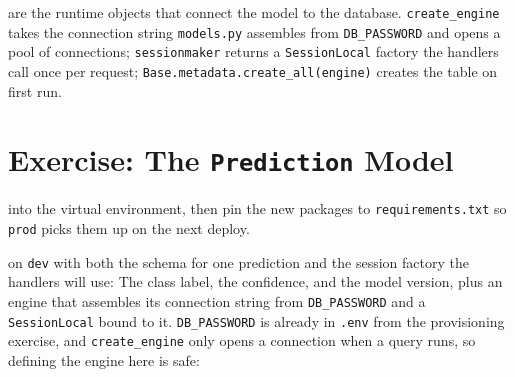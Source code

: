  are the runtime objects that connect
the model to the database. \texttt{create\_engine} takes the connection
string \texttt{models.py} assembles from \texttt{DB\_PASSWORD} and opens a
pool of connections;
\texttt{sessionmaker} returns a \texttt{SessionLocal} factory the handlers
call once per request; \texttt{Base.metadata.create\_all(engine)} creates
the table on first run.


\newpage
\section{Exercise: The \texttt{Prediction} Model}

 into the
virtual environment, then pin the new packages to
\texttt{requirements.txt} so \texttt{prod} picks them up on the next
deploy.


 on \texttt{dev} with both the
schema for one prediction and the session factory the handlers will use:
The class label, the confidence, and the model version, plus an engine
that assembles its connection string from \texttt{DB\_PASSWORD} and a
\texttt{SessionLocal} bound to it.
\texttt{DB\_PASSWORD} is already in \texttt{.env} from the provisioning
exercise, and \texttt{create\_engine} only opens a connection when a
query runs, so defining the engine here is safe:


